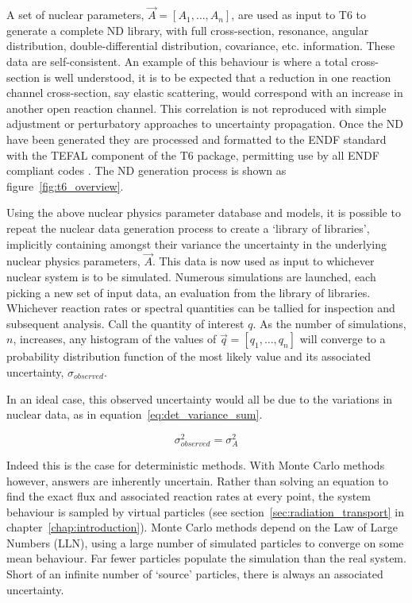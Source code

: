 A set of nuclear parameters, $\vec{A} = [A_{1},\ldots,A_{n}]$, are used as input to T6 to generate a complete ND library, with full cross-section, resonance, angular distribution, double-differential distribution, covariance, etc. information. These data are self-consistent. An example of this behaviour is where a total cross-section is well understood, it is to be expected that a reduction in one reaction channel cross-section, say elastic scattering, would correspond with an increase in another open reaction channel. This correlation is not reproduced with simple adjustment or perturbatory approaches to uncertainty propagation. Once the ND have been generated they are processed and formatted to the ENDF standard with the TEFAL component of the T6 package, permitting use by all ENDF compliant codes \cite{Koning2012}. The ND generation process is shown as figure~\ref{fig:t6_overview}.

Using the above nuclear physics parameter database and models, it is possible to repeat the nuclear data generation process to create a `library of libraries', implicitly containing amongst their variance the uncertainty in the underlying nuclear physics parameters, $\vec{A}$. This data is now used as input to whichever nuclear system is to be simulated. Numerous simulations are launched, each picking a new set of input data, an evaluation from the library of libraries. Whichever reaction rates or spectral quantities can be tallied for inspection and subsequent analysis. Call the quantity of interest $q$. As the number of simulations, $n$, increases, any histogram of the values of $\vec{q} = [q_{1},\ldots,q_{n}]$ will converge to a probability distribution function of the most likely value and its associated uncertainty, $\sigma_{observed}$. 

In an ideal case, this observed uncertainty would all be due to the variations in nuclear data, as in equation~\ref{eq:det_variance_sum}.

\begin{equation}
  \label{eq:det_variance_sum}
  \sigma_{observed}^{2} = \sigma_{A}^{2} 
\end{equation}

Indeed this is the case for deterministic methods. With Monte Carlo methods however, answers are inherently uncertain. Rather than solving an equation to find the exact flux and associated reaction rates at every point, the system behaviour is sampled by virtual particles (see section~\ref{sec:radiation_transport} in chapter~\ref{chap:introduction}). Monte Carlo methods depend on the Law of Large Numbers (LLN), using a large number of simulated particles to converge on some mean behaviour. Far fewer particles populate the simulation than the real system. Short of an infinite number of `source' particles, there is always an associated uncertainty. 

